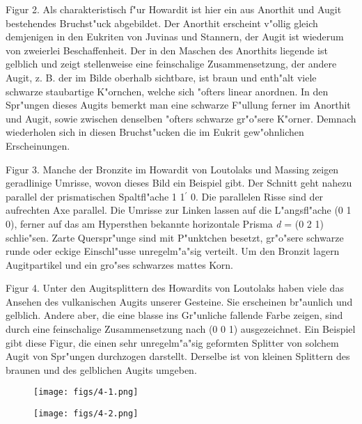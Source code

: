 \documentclass[a4paper, 11pt, oneside, polutonikogreek, german]{article}
\begin{document}
Figur 2. Als charakteristisch f"ur Howardit ist hier ein aus Anorthit und Augit bestehendes Bruchst"uck abgebildet. Der Anorthit erscheint v"ollig gleich demjenigen in den Eukriten von Juvinas und Stannern, der Augit ist wiederum von zweierlei Beschaffenheit. Der in den Maschen des Anorthits liegende ist gelblich und zeigt stellenweise eine feinschalige Zusammensetzung, der andere Augit, z. B. der im Bilde oberhalb sichtbare, ist braun und enth"alt viele schwarze staubartige K"ornchen, welche sich "ofters linear anordnen. In den Spr"ungen dieses Augits bemerkt man eine schwarze F"ullung ferner im Anorthit und Augit, sowie zwischen denselben "ofters schwarze gr"o"sere K"orner. Demnach wiederholen sich in diesen Bruchst"ucken die im Eukrit gew"ohnlichen Erscheinungen.

Figur 3. Manche der Bronzite im Howardit von Loutolaks und Massing zeigen geradlinige Umrisse, wovon dieses Bild ein Beispiel gibt. Der Schnitt geht nahezu parallel der prismatischen Spaltfl"ache 1 1$^{\prime}$ 0. Die parallelen Risse sind der aufrechten Axe parallel. Die Umrisse zur Linken lassen auf die L"angsfl"ache (0 1 0), ferner auf das am Hypersthen bekannte horizontale Prisma \emph{d} = (0 2 1) schlie"sen. Zarte Querspr"unge sind mit P"unktchen besetzt, gr"o"sere schwarze runde oder eckige Einschl"usse unregelm"a"sig verteilt. Um den Bronzit lagern Augitpartikel und ein gro"ses schwarzes mattes Korn.

Figur 4. Unter den Augitsplittern des Howardits von Loutolaks haben viele das Ansehen des vulkanischen Augits unserer Gesteine. Sie erscheinen br"aunlich und gelblich. Andere aber, die eine blasse ins Gr"unliche fallende Farbe zeigen, sind durch eine feinschalige Zusammensetzung nach (0 0 1) ausgezeichnet. Ein Beispiel gibt diese Figur, die einen sehr unregelm"a"sig geformten Splitter von solchem Augit von Spr"ungen durchzogen darstellt. Derselbe ist von kleinen Splittern des braunen und des gelblichen Augits umgeben.
\clearpage

\vspace*{\fill}
\begin{figure}[H]
\centering
\texttt{[image: figs/4-1.png]}
\caption{}
\end{figure}
\vspace*{\fill}
\clearpage

\vspace*{\fill}
\begin{figure}[H]
\centering
\texttt{[image: figs/4-2.png]}
\caption{}
\end{figure}
\vspace*{\fill}
\clearpage
\end{document}
